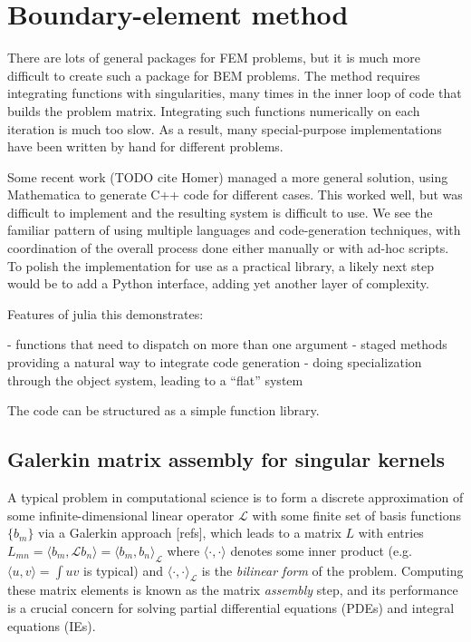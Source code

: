 \section{Boundary-element method}

There are lots of general packages for FEM problems, but it is much more
difficult to create such a package for BEM problems. The method requires
integrating functions with singularities, many times in the inner loop
of code that builds the problem matrix. Integrating such functions
numerically on each iteration is much too slow. As a result, many
special-purpose implementations have been written by hand for different
problems.

Some recent work (TODO cite Homer) managed a more general solution,
using Mathematica to generate C++ code for different cases. This worked
well, but was difficult to implement and the resulting system is difficult
to use. We see the familiar pattern of using multiple languages and
code-generation techniques, with coordination of the overall process done
either manually or with ad-hoc scripts. To polish the implementation for
use as a practical library, a likely next step would be to add a Python
interface, adding yet another layer of complexity.


Features of julia this demonstrates:

- functions that need to dispatch on more than one argument
- staged methods providing a natural way to integrate code generation
- doing specialization through the object system, leading to a ``flat'' system

The code can be structured as a simple function library.



\subsection{Galerkin matrix assembly for singular kernels}

A typical problem in computational science is to form a discrete approximation of some infinite-dimensional linear operator $\mathcal{L}$ with some finite set of basis functions $\{ b_m \}$ via a Galerkin approach [refs], which leads to a matrix $L$ with entries $L_{mn} = \langle b_m, \mathcal{L} b_n \rangle = \langle b_m, b_n \rangle_\mathcal{L}$ where $\langle \cdot, \cdot \rangle$ denotes some inner product (e.g. $\langle u, v \rangle = \int u v$ is typical) and  $\langle \cdot, \cdot \rangle_\mathcal{L}$ is the \emph{bilinear form} of the problem.  Computing these matrix elements is known as the matrix \emph{assembly} step, and its performance is a crucial concern for solving partial differential equations (PDEs) and integral equations (IEs).

